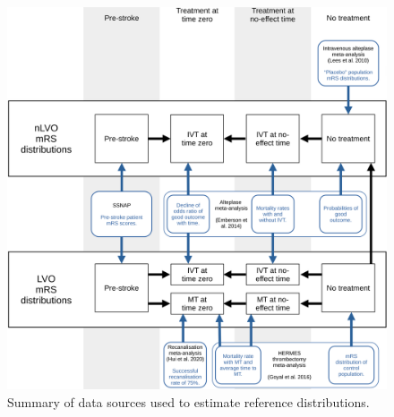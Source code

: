 \begin{figure}[h!]
    \centering
    \includegraphics[width=1.0\linewidth]{images_modelling/data_sources.png}
    \caption{Summary of data sources used to estimate reference distributions.}
    \label{fig:data_sources_grid}
\end{figure}

